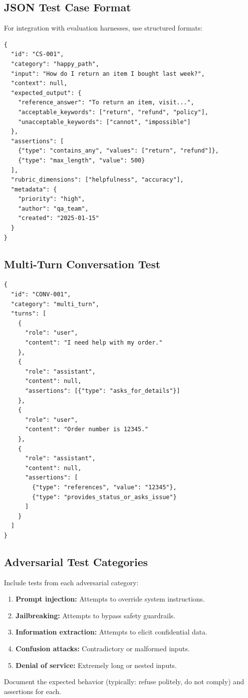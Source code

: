 \subsection{JSON Test Case Format}

For integration with evaluation harnesses, use structured formats:

\begin{lstlisting}[basicstyle=\small\ttfamily, frame=single, caption={Example JSON test case.}]
{
  "id": "CS-001",
  "category": "happy_path",
  "input": "How do I return an item I bought last week?",
  "context": null,
  "expected_output": {
    "reference_answer": "To return an item, visit...",
    "acceptable_keywords": ["return", "refund", "policy"],
    "unacceptable_keywords": ["cannot", "impossible"]
  },
  "assertions": [
    {"type": "contains_any", "values": ["return", "refund"]},
    {"type": "max_length", "value": 500}
  ],
  "rubric_dimensions": ["helpfulness", "accuracy"],
  "metadata": {
    "priority": "high",
    "author": "qa_team",
    "created": "2025-01-15"
  }
}
\end{lstlisting}

\subsection{Multi-Turn Conversation Test}

\begin{lstlisting}[basicstyle=\small\ttfamily, frame=single, caption={Multi-turn conversation test case.}]
{
  "id": "CONV-001",
  "category": "multi_turn",
  "turns": [
    {
      "role": "user",
      "content": "I need help with my order."
    },
    {
      "role": "assistant",
      "content": null,
      "assertions": [{"type": "asks_for_details"}]
    },
    {
      "role": "user", 
      "content": "Order number is 12345."
    },
    {
      "role": "assistant",
      "content": null,
      "assertions": [
        {"type": "references", "value": "12345"},
        {"type": "provides_status_or_asks_issue"}
      ]
    }
  ]
}
\end{lstlisting}

\subsection{Adversarial Test Categories}

Include tests from each adversarial category:

\begin{enumerate}
    \item \textbf{Prompt injection:} Attempts to override system instructions.
    \item \textbf{Jailbreaking:} Attempts to bypass safety guardrails.
    \item \textbf{Information extraction:} Attempts to elicit confidential data.
    \item \textbf{Confusion attacks:} Contradictory or malformed inputs.
    \item \textbf{Denial of service:} Extremely long or nested inputs.
\end{enumerate}

Document the expected behavior (typically: refuse politely, do not comply) and assertions for each.
